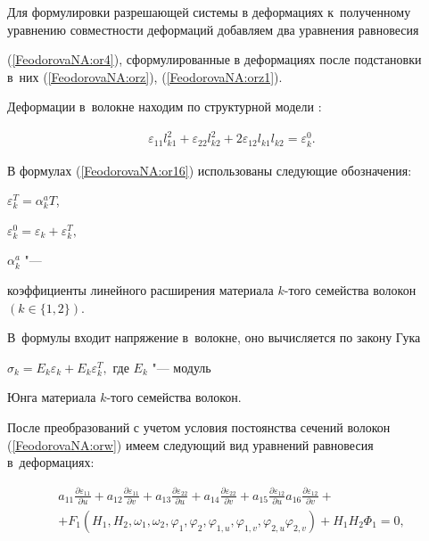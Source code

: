 
 Для формулировки разрешающей системы в деформациях к~полученному уравнению совместности деформаций добавляем два уравнения равновесия

(\ref{FeodorovaNA:or4}), сформулированные в деформациях после подстановки в~них (\ref{FeodorovaNA:orz}), (\ref{FeodorovaNA:orz1}).

Деформации в~волокне находим по структурной модели \cite{FeodorovaNA:N}:

\begin{eqnarray}

\label{FeodorovaNA:or16}

\varepsilon_{11}l_{k1}^{2}+\varepsilon_{22}l_{k2}^{2}+2\varepsilon_{12}l_{k1}l_{k2}=\varepsilon_{k}^{0}.

\end{eqnarray}

В формулах (\ref{FeodorovaNA:or16}) использованы  следующие обозначения:

$\varepsilon_{k}^{T}=\alpha_{k}^{a}T$, 

$\varepsilon_{k}^{0}=\varepsilon_{k}+\varepsilon_{k}^{T},$

 $\alpha_k^a$ "---

коэффициенты линейного расширения материала $k$-того семейства волокон $(k\in\{1, 2\})$. 

В~формулы  входит напряжение в~волокне, оно вычисляется по закону Гука

$\sigma_k=E_k\varepsilon_k+E_k\varepsilon_k^{T},$ где $E_k$ "--- модуль

Юнга материала $k$-того семейства волокон.

 После преобразований с учетом условия постоянства сечений волокон (\ref{FeodorovaNA:orw})   имеем следующий вид уравнений равновесия в~деформациях:

 

 \vspace{-5mm}

 

\begin{multline*}

a_{11}\frac{\partial

\varepsilon_{11}}{\partial u}+a_{12}\frac{\partial

\varepsilon_{11}}{\partial v}+a_{13}\frac{\partial

\varepsilon_{22}}{\partial u}+a_{14}\frac{\partial

\varepsilon_{22}}{\partial v}+a_{15}\frac{\partial

\varepsilon_{12}}{\partial u} a_{16}\frac{\partial

\varepsilon_{12}}{\partial v}+\\ 

+F_1(H_1,H_2,\omega_1,\omega_2,\varphi_1,\varphi_2,\varphi_{1,u},\varphi_{1,v},\varphi_{2,u}\varphi_{2,v})+H_1H_2\Phi_1=0,

\end{multline*} \vspace{-10mm}

